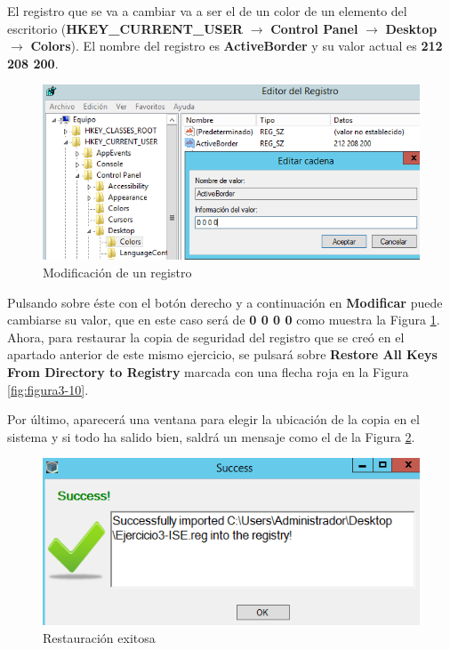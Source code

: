 	El registro que se va a cambiar va a ser el de un color de un elemento del escritorio (\textbf{HKEY\_CURRENT\_USER} $ \rightarrow $ \textbf{Control Panel} $ \rightarrow $ \textbf{Desktop} $ \rightarrow $ \textbf{Colors}). El nombre del registro es \textbf{ActiveBorder} y su valor actual es \textbf{212 208 200}.
	\begin{figure}[H] %
		\centering
		\includegraphics[scale=0.6]{figuras/ejercicio3/figura3-11.png} 
		\caption{Modificación de un registro} 
		\label{fig:figura3-11}
	\end{figure}
	
	Pulsando sobre éste con el botón derecho y a continuación en \textbf{Modificar} puede cambiarse su valor, que en este caso será de \textbf{0 0 0 0} como muestra la Figura \ref{fig:figura3-11}.
	\\
	
	Ahora, para restaurar la copia de seguridad del registro que se creó en el apartado anterior de este mismo ejercicio, se pulsará sobre \textbf{Restore All Keys From Directory to Registry} marcada con una flecha roja en la Figura \ref{fig:figura3-10}.
	
	Por último, aparecerá una ventana para elegir la ubicación de la copia en el sistema y si todo ha salido bien, saldrá un mensaje como el de la Figura \ref{fig:figura3-13}.
		\begin{figure}[H] %
			\centering
			\includegraphics[scale=0.9]{figuras/ejercicio3/figura3-13.png} 
			\caption{Restauración exitosa} 
			\label{fig:figura3-13}
		\end{figure} 
	
